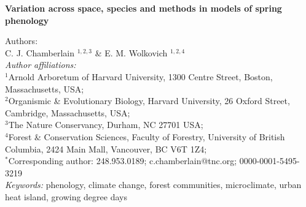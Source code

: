 \documentclass{article}\usepackage[]{graphicx}\usepackage[]{color}
\begin{document}
\noindent\textbf{\Large{Variation across space, species and methods in models of spring phenology}}

\noindent Authors:\\
C. J. Chamberlain $^{1,2,3}$ \& E. M. Wolkovich $^{1,2,4}$
\vspace{2ex}\\
\emph{Author affiliations:}\\
$^{1}$Arnold Arboretum of Harvard University, 1300 Centre Street, Boston, Massachusetts, USA; \\
$^{2}$Organismic \& Evolutionary Biology, Harvard University, 26 Oxford Street, Cambridge, Massachusetts, USA; \\
$^{3}$The Nature Conservancy, Durham, NC 27701 USA;\\
$^{4}$Forest \& Conservation Sciences, Faculty of Forestry, University of British Columbia, 2424 Main Mall, Vancouver, BC V6T 1Z4;\\
\vspace{2ex}
$^*$Corresponding author: 248.953.0189; c.chamberlain@tnc.org; 0000-0001-5495-3219\\

\noindent \emph{Keywords:} phenology, climate change, forest communities, microclimate, urban heat island, growing degree days\\

\renewcommand{\thetable}{\arabic{table}}
\renewcommand{\thefigure}{\arabic{figure}}
\renewcommand{\labelitemi}{$-$}



\end{document}
